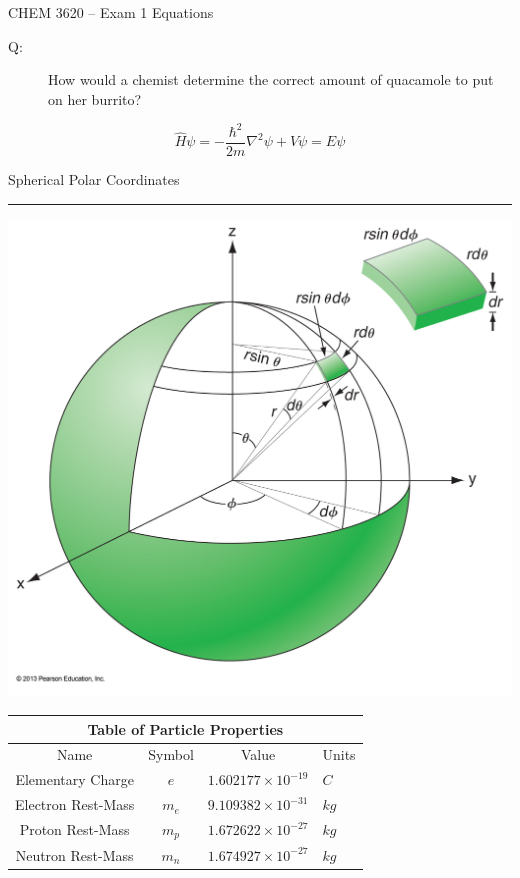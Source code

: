 \documentclass[12pt, letterpaper]{memoir}
\begin{document}
	\mainmatter
	
	\begin{center}
		{\Huge CHEM 3620}
		{\LARGE-- Exam 1 Equations}
		\begin{description}
			\item[Q:] How would a chemist determine the correct amount of quacamole to put on her burrito?
		\end{description}
	
		
		\begin{center}
			\begin{equation*}
				\hat{H}\psi = -\dfrac{\hbar^2}{2m}\nabla^2\psi + V\psi = E\psi
			\end{equation*}
		
		
			\begin{minipage}[c]{0.7\textwidth}
				\begin{mdframed}
					\centering
					Spherical Polar Coordinates
					\hrule
					\includegraphics[width = \textwidth]{02_05_Figure}
				\end{mdframed}
			\end{minipage}
		\end{center}

	
		
		\begin{tabular}{ccrl}
			\multicolumn{4}{c}{Table of Particle Properties}\\
			\toprule
			Name&Symbol&\multicolumn{1}{c}{Value}&\multicolumn{1}{c}{Units}\\
			\midrule
			\midrule
			Elementary Charge		& $e$		& $1.602177\times10^{-19}$	& $C$\\
			\midrule
			Electron Rest-Mass		& $m_e$		& $9.109382\times10^{-31}$	& $kg$\\
			\midrule
			Proton Rest-Mass		& $m_p$		& $1.672622\times10^{-27}$	& $kg$\\
			\midrule
			Neutron Rest-Mass		& $m_n$		& $1.674927\times10^{-27}$	& $kg$\\
			\bottomrule
		\end{tabular}


\end{center}
\end{document}
